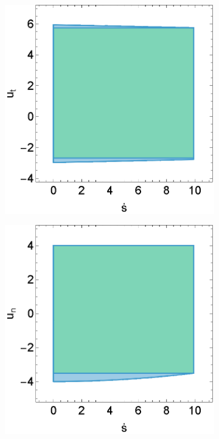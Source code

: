 \begin{figure}[h]
	\centering
	\begin{subfigure}[b]{0.32\textwidth}
		\centering
		\includegraphics[width=\textwidth]{content/main_paper/region_x3u1_plot_gr1.eps}
	\end{subfigure}
	\begin{subfigure}[b]{0.32\textwidth}
		\centering
		\includegraphics[width=\textwidth]{content/main_paper/region_x3u2_plot_gr1.eps}

\end{subfigure}
\end{figure}
